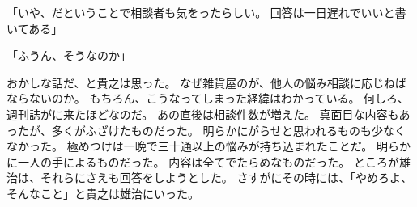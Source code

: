 \documentclass[chapter3.tex]{subfiles}
\begin{document}
\begin{CJK}{UTF8}{ipxm}
    「いや、だということで相談者も気をったらしい。
    回答は一日遅れでいいと書いてある」

    「ふうん、そうなのか」

    おかしな話だ、と貴之は思った。
    なぜ雑貨屋のが、他人の悩み相談に応じねばならないのか。
    もちろん、こうなってしまった経緯はわかっている。
    何しろ、週刊誌がに来たほどなのだ。
    あの直後は相談件数が増えた。
    真面目な内容もあったが、多くがふざけたものだった。
    明らかにがらせと思われるものも少なくなかった。
    極めつけは一晩で三十通以上の悩みが持ち込まれたことだ。
    明らかに一人の手によるものだった。
    内容は全てでたらめなものだった。
    ところが雄治は、それらにさえも回答をしようとした。
    さすがにその時には、「やめろよ、そんなこと」と貴之は雄治にいった。

\end{CJK}
\end{document}
